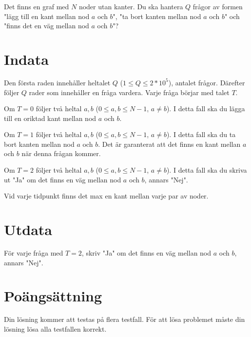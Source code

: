 Det finns en graf med $N$ noder utan kanter. Du ska hantera $Q$ frågor av formen "lägg till en kant mellan
nod $a$ och $b$", "ta bort kanten mellan nod $a$ och $b$" och "finns det en väg mellan nod $a$ och $b$"?



\section*{Indata}
Den första raden innehåller heltalet $Q$ ($1 \leq Q \leq 2*10^5$), antalet frågor.
Därefter följer $Q$ rader som innehåller en fråga vardera. Varje fråga börjar med talet $T$.

Om $T=0$ följer två heltal $a,b$ ($0 \leq a,b \leq N-1$, $a \neq b$). I detta fall ska du lägga till en oriktad kant mellan nod $a$ och $b$.

Om $T=1$ följer två heltal $a,b$ ($0 \leq a,b \leq N-1$, $a \neq b$). I detta fall ska du ta bort kanten mellan nod $a$ och $b$. Det är 
garanterat att det finns en kant mellan $a$ och $b$ när denna frågan kommer.

Om $T=2$ följer två heltal $a,b$ ($0 \leq a,b \leq N-1$, $a \neq b$). I detta fall ska du skriva ut "Ja" om det finns en väg mellan nod
$a$ och $b$, annars "Nej".

Vid varje tidpunkt finns det max en kant mellan varje par av noder.

\section*{Utdata}
För varje fråga med $T=2$, skriv "Ja" om det finns en väg mellan nod $a$ och $b$, annars "Nej".

\section*{Poängsättning}
Din lösning kommer att testas på flera testfall.
\noindent
För att lösa problemet måste din lösning lösa alla testfallen korrekt.
